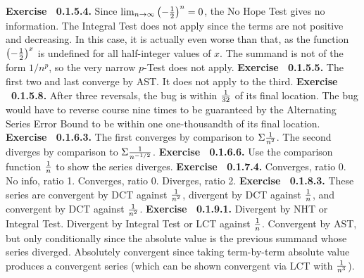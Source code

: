  {\noindent \protect \bf  Exercise ~0.1.5.4.} \textbullet Since $\protect \qopname  \relax m{lim}_{n\to \infty }\left (-\protect \frac  {1}{2}\right )^n=0$, the No Hope Test gives no information. \textbullet The Integral Test does not apply since the terms are not positive and decreasing. In this case, it is actually even worse than that, as the function $\left (-\protect \frac  {1}{2}\right )^x$ is undefined for all half-integer values of $x$. \textbullet The summand is not of the form $1/n^p$, so the very narrow $p$-Test does not apply. \protect \newline  \protect \newline  
 {\noindent \protect \bf  Exercise ~0.1.5.5.} The first two and last converge by AST. It does not apply to the third. \protect \newline  \protect \newline  
 {\noindent \protect \bf  Exercise ~0.1.5.8.} After three reversals, the bug is within $\protect \frac  {1}{32}$ of its final location. The bug would have to reverse course nine times to be guaranteed by the Alternating Series Error Bound to be within one one-thousandth of its final location.  \protect \newline  \protect \newline  
 {\noindent \protect \bf  Exercise ~0.1.6.3.} The first converges by comparison to $\Sigma \protect \frac  {1}{n^2}$. The second diverges by comparison to $\Sigma \protect \frac  {1}{n^{-1/2}}$. \protect \newline  \protect \newline  
 {\noindent \protect \bf  Exercise ~0.1.6.6.} Use the comparison function $\protect \frac  {1}{n}$ to show the series diverges. \protect \newline  \protect \newline  
 {\noindent \protect \bf  Exercise ~0.1.7.4.} \textbullet Converges, ratio 0. \textbullet No info, ratio 1. \textbullet Converges, ratio 0. \textbullet Diverges, ratio 2. \protect \newline  \protect \newline  
 {\noindent \protect \bf  Exercise ~0.1.8.3.} These series are convergent by DCT against $\protect \frac  {1}{n^2}$, divergent by DCT against $\protect \frac  {1}{n}$, and convergent by DCT against $\protect \frac  {1}{n^2}$. \protect \newline  \protect \newline  
 {\noindent \protect \bf  Exercise ~0.1.9.1.} \textbullet Divergent by NHT or Integral Test. \textbullet Divergent by Integral Test or LCT against $\protect \frac  {1}{n}$. \textbullet Convergent by AST, but only conditionally since the absolute value is the previous summand whose series diverged. \textbullet Absolutely convergent since taking term-by-term absolute value produces a convergent series (which can be shown convergent via LCT with $\protect \frac  {1}{n^3}$). \protect \newline  \protect \newline  
